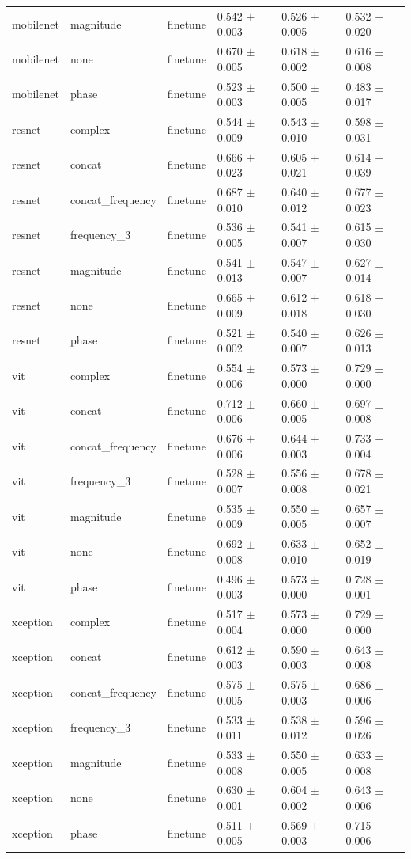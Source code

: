\begin{table}
\begin{tabular}{llllll}
mobilenet & magnitude & finetune & 0.542 $\pm$ 0.003 & 0.526 $\pm$ 0.005 & 0.532 $\pm$ 0.020 \\
mobilenet & none & finetune & 0.670 $\pm$ 0.005 & 0.618 $\pm$ 0.002 & 0.616 $\pm$ 0.008 \\
mobilenet & phase & finetune & 0.523 $\pm$ 0.003 & 0.500 $\pm$ 0.005 & 0.483 $\pm$ 0.017 \\
resnet & complex & finetune & 0.544 $\pm$ 0.009 & 0.543 $\pm$ 0.010 & 0.598 $\pm$ 0.031 \\
resnet & concat & finetune & 0.666 $\pm$ 0.023 & 0.605 $\pm$ 0.021 & 0.614 $\pm$ 0.039 \\
resnet & concat_frequency & finetune & 0.687 $\pm$ 0.010 & 0.640 $\pm$ 0.012 & 0.677 $\pm$ 0.023 \\
resnet & frequency_3 & finetune & 0.536 $\pm$ 0.005 & 0.541 $\pm$ 0.007 & 0.615 $\pm$ 0.030 \\
resnet & magnitude & finetune & 0.541 $\pm$ 0.013 & 0.547 $\pm$ 0.007 & 0.627 $\pm$ 0.014 \\
resnet & none & finetune & 0.665 $\pm$ 0.009 & 0.612 $\pm$ 0.018 & 0.618 $\pm$ 0.030 \\
resnet & phase & finetune & 0.521 $\pm$ 0.002 & 0.540 $\pm$ 0.007 & 0.626 $\pm$ 0.013 \\
vit & complex & finetune & 0.554 $\pm$ 0.006 & 0.573 $\pm$ 0.000 & 0.729 $\pm$ 0.000 \\
vit & concat & finetune & 0.712 $\pm$ 0.006 & 0.660 $\pm$ 0.005 & 0.697 $\pm$ 0.008 \\
vit & concat_frequency & finetune & 0.676 $\pm$ 0.006 & 0.644 $\pm$ 0.003 & 0.733 $\pm$ 0.004 \\
vit & frequency_3 & finetune & 0.528 $\pm$ 0.007 & 0.556 $\pm$ 0.008 & 0.678 $\pm$ 0.021 \\
vit & magnitude & finetune & 0.535 $\pm$ 0.009 & 0.550 $\pm$ 0.005 & 0.657 $\pm$ 0.007 \\
vit & none & finetune & 0.692 $\pm$ 0.008 & 0.633 $\pm$ 0.010 & 0.652 $\pm$ 0.019 \\
vit & phase & finetune & 0.496 $\pm$ 0.003 & 0.573 $\pm$ 0.000 & 0.728 $\pm$ 0.001 \\
xception & complex & finetune & 0.517 $\pm$ 0.004 & 0.573 $\pm$ 0.000 & 0.729 $\pm$ 0.000 \\
xception & concat & finetune & 0.612 $\pm$ 0.003 & 0.590 $\pm$ 0.003 & 0.643 $\pm$ 0.008 \\
xception & concat_frequency & finetune & 0.575 $\pm$ 0.005 & 0.575 $\pm$ 0.003 & 0.686 $\pm$ 0.006 \\
xception & frequency_3 & finetune & 0.533 $\pm$ 0.011 & 0.538 $\pm$ 0.012 & 0.596 $\pm$ 0.026 \\
xception & magnitude & finetune & 0.533 $\pm$ 0.008 & 0.550 $\pm$ 0.005 & 0.633 $\pm$ 0.008 \\
xception & none & finetune & 0.630 $\pm$ 0.001 & 0.604 $\pm$ 0.002 & 0.643 $\pm$ 0.006 \\
xception & phase & finetune & 0.511 $\pm$ 0.005 & 0.569 $\pm$ 0.003 & 0.715 $\pm$ 0.006 \\
\bottomrule
\end{tabular}
\end{table}

